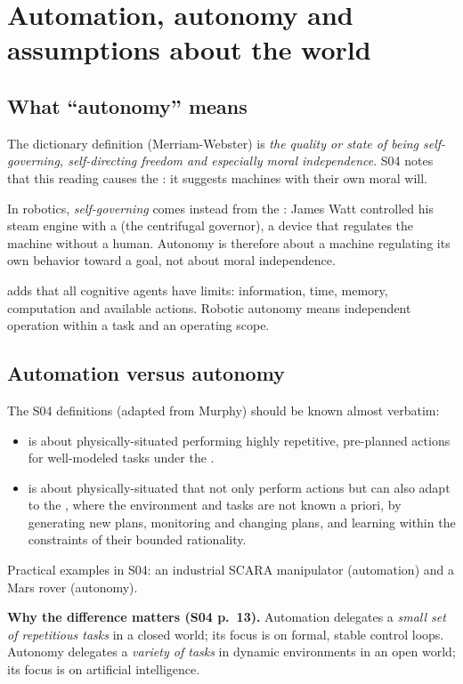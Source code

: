 \section{Automation, autonomy and assumptions about the world}
\subsection{What ``autonomy'' means}
The dictionary definition (Merriam-Webster) is \emph{the quality or state of being self-governing, self-directing freedom and especially moral independence}. S04 notes that this reading causes the : it suggests machines with their own moral will.

In robotics, \emph{self-governing} comes instead from the : James Watt controlled his steam engine with a  (the centrifugal governor), a device that regulates the machine without a human. Autonomy is therefore about a machine regulating its own behavior toward a goal, not about moral independence.

 adds that all cognitive agents have limits: information, time, memory, computation and available actions. Robotic autonomy means independent operation within a task and an operating scope.

\subsection{Automation versus autonomy}
The S04 definitions (adapted from Murphy) should be known almost verbatim:
\begin{itemize}
\item {} is about physically-situated  performing highly repetitive, pre-planned actions for well-modeled tasks under the .
\item {} is about physically-situated  that not only perform actions but can also adapt to the , where the environment and tasks are not known a priori, by generating new plans, monitoring and changing plans, and learning within the constraints of their bounded rationality.
\end{itemize}
Practical examples in S04: an industrial SCARA manipulator (automation) and a Mars rover (autonomy).

\textbf{Why the difference matters (S04 p.~13).} Automation delegates a \emph{small set of repetitious tasks} in a closed world; its focus is on formal, stable control loops. Autonomy delegates a \emph{variety of tasks} in dynamic environments in an open world; its focus is on artificial intelligence.

